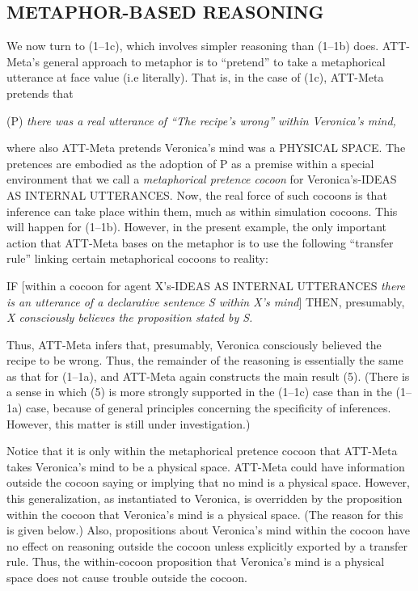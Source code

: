 \addtolength{\baselineskip}{+.6\baselineskip}




\subsection{METAPHOR-BASED REASONING}%

We now turn to (1--1c), which involves simpler reasoning than (1--1b) does.
ATT-Meta's general approach to metaphor is to ``pretend'' to take a
metaphorical utterance at face value (i.e literally).  That is, in the case
of (1c), ATT-Meta pretends that 

(P) {\it there was a {\it real} utterance of ``The recipe's wrong'' within Veronica's mind,}

where also ATT-Meta pretends Veronica's mind was a PHYSICAL SPACE.  The
pretences are embodied as the adoption of P as a premise within a special
environment that we call a {\it metaphorical pretence cocoon} for
Veronica's-IDEAS AS INTERNAL UTTERANCES.  Now, the real force of such cocoons
is that inference can take place within them, much as within simulation
cocoons. This will happen for (1--1b). However, in the present example, the
only important action that ATT-Meta bases on the metaphor is to use the
following ``transfer rule'' linking certain metaphorical cocoons to reality:

\addtolength{\baselineskip}{-.375\baselineskip}

\hang{} IF [within a cocoon for agent X's-IDEAS AS INTERNAL
UTTERANCES {\it there is an utterance of a declarative sentence S within X's
mind}] THEN, presumably, {\it X consciously believes the proposition stated by
S.}

\addtolength{\baselineskip}{+.6\baselineskip}

Thus, ATT-Meta infers that, presumably, Veronica consciously believed the
recipe to be wrong.  Thus, the remainder of the reasoning is essentially the
same as that for (1--1a), and ATT-Meta again constructs the main result
(5). (There is a sense in which (5) is more
strongly supported in the (1--1c) case than in the (1--1a) case, because of
general principles concerning the specificity of inferences. However, this
matter is still under investigation.)

Notice that it is only within the metaphorical pretence cocoon that ATT-Meta
takes Veronica's mind to be a physical space. ATT-Meta could have information
outside the cocoon saying or implying that no mind is a physical space.
However, this generalization, as instantiated to Veronica, is overridden by the
proposition within the cocoon that Veronica's mind is a physical space. (The
reason for this is given below.)  Also, propositions about Veronica's mind
within the cocoon have no effect on reasoning outside the cocoon unless
explicitly exported by a transfer rule. Thus, the within-cocoon proposition
that Veronica's mind is a physical space does not cause trouble outside the
cocoon.


